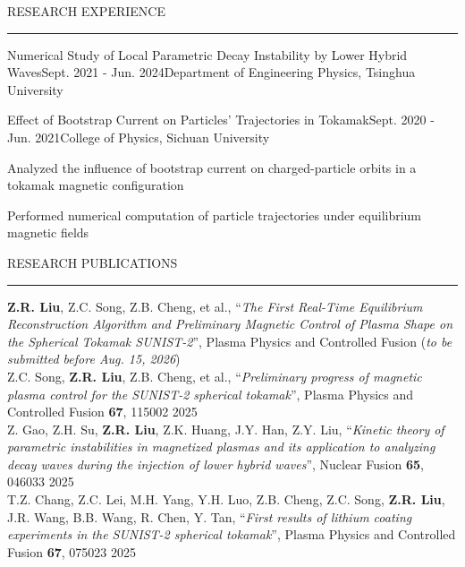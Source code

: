 \documentclass{resume} %
\renewenvironment{rSection}[1]{
\sectionskip
\textcolor{TsinghuaPurple}{\MakeUppercase{#1}}
\sectionlineskip
\hrule
\begin{list}{}{
\setlength{\leftmargin}{0em}
}
\item[]
}{
\end{list}
}
\begin{document}
\begin{rSection}{RESEARCH Experience}
\begin{rSubsection}{Numerical Study of Local Parametric Decay Instability by Lower Hybrid Waves}{Sept. 2021 - Jun. 2024}{Department of Engineering Physics, Tsinghua University}{}
\end{rSubsection}


\begin{rSubsection}{Effect of Bootstrap Current on Particles' Trajectories in Tokamak}{Sept. 2020 - Jun. 2021}{College of Physics, Sichuan University}{}

\item Analyzed the influence of bootstrap current on charged-particle orbits in a tokamak magnetic configuration
\item Performed numerical computation of particle trajectories under equilibrium magnetic fields

\end{rSubsection}

\end{rSection}

\begin{rSection}{Research Publications} \itemsep -3pt

{\textbf{Z.R. Liu}, Z.C. Song, Z.B. Cheng, et al., ``\textit{The First Real-Time Equilibrium Reconstruction Algorithm and Preliminary Magnetic Control of Plasma Shape on the Spherical Tokamak SUNIST-2}'', Plasma Physics and Controlled Fusion (\textit{to be submitted before Aug. 15, 2026})} \\[4pt]

{Z.C. Song, \textbf{Z.R. Liu}, Z.B. Cheng, et al., ``\textit{Preliminary progress of magnetic plasma control for the SUNIST-2 spherical tokamak}'', Plasma Physics and Controlled Fusion \textbf{67}, 115002} \hfill 2025 \\[4pt]

{Z. Gao, Z.H. Su, \textbf{Z.R. Liu}, Z.K. Huang, J.Y. Han, Z.Y. Liu, ``\textit{Kinetic theory of parametric instabilities in magnetized plasmas and its application to analyzing decay waves during the injection of lower hybrid waves}'', Nuclear Fusion \textbf{65}, 046033} \hfill 2025 \\[4pt]

{T.Z. Chang, Z.C. Lei, M.H. Yang, Y.H. Luo, Z.B. Cheng, Z.C. Song, \textbf{Z.R. Liu}, J.R. Wang, B.B. Wang, R. Chen, Y. Tan, ``\textit{First results of lithium coating experiments in the SUNIST-2 spherical tokamak}'', Plasma Physics and Controlled Fusion \textbf{67}, 075023} \hfill 2025 \\

\end{rSection}
\end{document}
